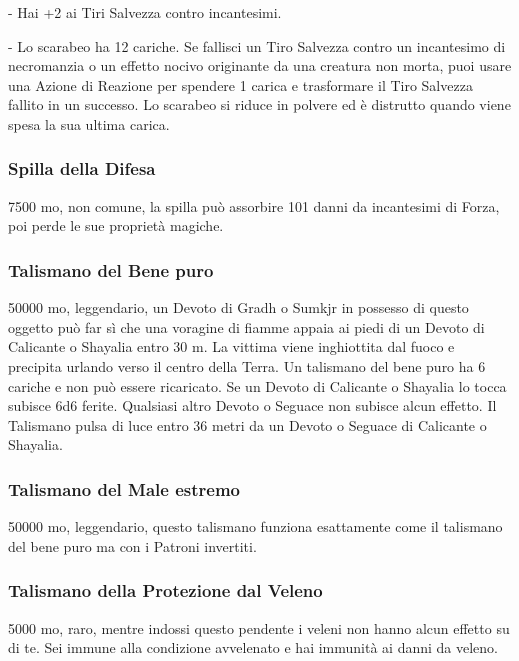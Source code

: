 \begin{multicols}{2}
- Hai +2 ai Tiri Salvezza contro incantesimi.

- Lo scarabeo ha 12 cariche. Se fallisci un Tiro Salvezza contro un incantesimo di necromanzia o un effetto nocivo originante da una creatura non morta, puoi usare una Azione di Reazione per spendere 1 carica e trasformare il Tiro Salvezza fallito in un successo. Lo scarabeo si riduce in polvere ed è distrutto quando viene spesa la sua ultima carica.

\subsubsection*{Spilla della Difesa}

7500 mo, non comune, la spilla può assorbire 101 danni da incantesimi di Forza, poi perde le sue proprietà magiche.

\subsubsection*{Talismano del Bene puro}
50000 mo, leggendario, un Devoto di Gradh o Sumkjr in possesso di questo oggetto può far sì che una voragine di fiamme appaia ai piedi di un Devoto di Calicante o Shayalia entro 30 m. La vittima viene inghiottita dal fuoco e precipita urlando verso il centro della Terra. Un talismano del bene puro ha 6 cariche e non può essere ricaricato. Se un Devoto di Calicante o Shayalia lo tocca subisce 6d6 ferite. Qualsiasi altro Devoto o Seguace non subisce alcun effetto. Il Talismano pulsa di luce entro 36 metri da un Devoto o Seguace di Calicante o Shayalia.

\subsubsection*{Talismano del Male estremo}
50000 mo, leggendario, questo talismano funziona esattamente come il talismano del bene puro ma con i Patroni invertiti.

\subsubsection*{Talismano della Protezione dal Veleno}
5000 mo, raro, mentre indossi questo pendente i veleni non hanno alcun effetto su di te. Sei immune alla condizione avvelenato e hai immunità ai danni da veleno.


\end{multicols}
